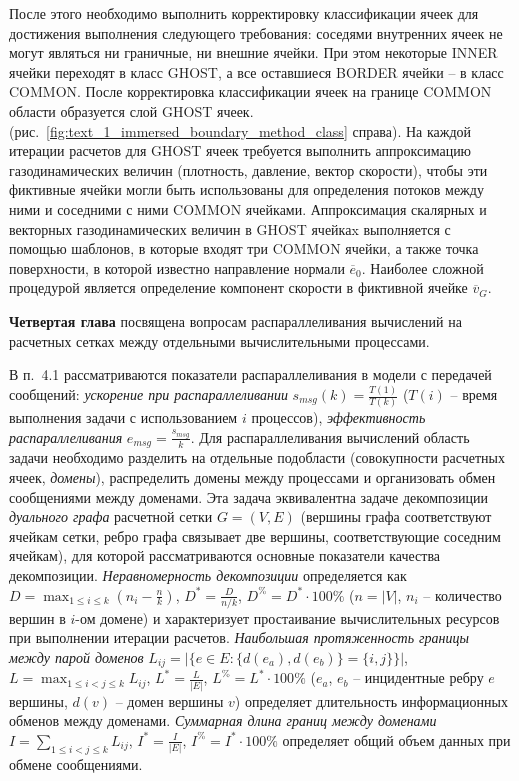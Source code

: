 \documentclass[a4paper,14pt]{extarticle}                     %
\theoremstyle{plain}                                         %
\begin{document}
После этого необходимо выполнить корректировку классификации ячеек для достижения выполнения следующего требования: соседями внутренних ячеек не могут являться ни граничные, ни внешние ячейки.
При этом некоторые INNER ячейки переходят в класс GHOST, а все оставшиеся BORDER ячейки -- в класс COMMON.
После корректировка классификации ячеек на границе COMMON области образуется слой GHOST ячеек. (рис.~\ref{fig:text_1_immersed_boundary_method_class} справа).
На каждой итерации расчетов для GHOST ячеек требуется выполнить аппроксимацию газодинамических величин (плотность, давление, вектор скорости), чтобы эти фиктивные ячейки могли быть использованы для определения потоков между ними и соседними с ними COMMON ячейками.
Аппроксимация скалярных и векторных газодинамических величин в GHOST ячейкаx выполняется с помощью шаблонов, в которые входят три COMMON ячейки, а также точка поверхности, в которой известно направление нормали $\overline{e}_0$.
Наиболее сложной процедурой является определение компонент скорости в фиктивной ячейке $\overline{v}_G$.


\newpage
\textbf{Четвертая глава} посвящена вопросам распараллеливания вычислений на расчетных сетках между отдельными вычислительными процессами.


В п.~4.1 рассматриваются показатели распараллеливания в модели с передачей сообщений: \textit{ускорение при распараллеливании} $s_{msg}(k) = \frac{T(1)}{T(k)}$ ($T(i)$ -- время выполнения задачи с использованием $i$ процессов), \textit{эффективность распараллеливания} $e_{msg} = \frac{s_{msg}}{k}$.
Для распараллеливания вычислений область задачи необходимо разделить на отдельные подобласти (совокупности расчетных ячеек, \textit{домены}), распределить домены между процессами и организовать обмен сообщениями между доменами.
Эта задача эквивалентна задаче декомпозиции \textit{дуального графа} расчетной сетки $G = (V, E)$ (вершины графа соответствуют ячейкам сетки, ребро графа связывает две вершины, соответствующие соседним ячейкам), для которой рассматриваются основные показатели качества декомпозиции.
\textit{Неравномерность декомпозиции} определяется как $D = \max_{1 \le i \le k}{ \left( n_i - \frac{n}{k} \right) }$, $D^{*} = \frac{D}{n / k}$, $D^{\%} = D^{*} \cdot 100\%$ ($n = |V|$, $n_i$ -- количество вершин в $i$-ом домене) и характеризует простаивание вычислительных ресурсов при выполнении итерации расчетов.
\textit{Наибольшая протяженность границы между парой доменов} $L_{ij} = \left| \{ e \in E: \{ d(e_a), d(e_b) \} = \{ i, j \} \} \right|$, $L = \max_{1 \le i < j \le k}{L_{ij}}$, $L^{*} = \frac{L}{|E|}$, $L^{\%} = L^{*} \cdot 100\%$ ($e_a$, $e_b$ -- инцидентные ребру $e$ вершины, $d(v)$ -- домен вершины $v$) определяет длительность информационных обменов между доменами.
\textit{Суммарная длина границ между доменами} $I = \sum_{1 \le i < j \le k}{L_{ij}}$, $I^{*} = \frac{I}{|E|}$, $I^{\%} = I^{*} \cdot 100\%$ определяет общий объем данных при обмене сообщениями.
\end{document}
